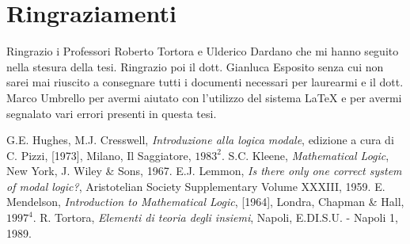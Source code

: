 \documentclass[a4paper, titlepage, 12pt]{report}
\begin{document}
\chapter*{Ringraziamenti}
Ringrazio i Professori Roberto Tortora e Ulderico Dardano che mi hanno seguito
nella stesura della tesi. Ringrazio poi il dott. Gianluca Esposito senza cui
non sarei mai riuscito a consegnare tutti i documenti necessari per laurearmi
e il dott. Marco Umbrello per avermi aiutato con l'utilizzo del sistema \LaTeX{}
e per avermi segnalato vari errori presenti in questa tesi.

\begin{thebibliography}{5}
 G.E. Hughes, M.J. Cresswell, \textit{Introduzione alla logica modale},
edizione a cura di C. Pizzi, [1973], Milano, Il Saggiatore, $1983^{2}$.
 S.C. Kleene, \textit{Mathematical Logic}, New York, J. Wiley \& Sons, 1967.
 E.J. Lemmon, \textit{Is there only one correct system of modal logic?}, Aristotelian Society Supplementary Volume XXXIII, 1959.
 E. Mendelson, \textit{Introduction to Mathematical Logic}, [1964], Londra, Chapman \& Hall, $1997^{4}$.
 R. Tortora, \textit{Elementi di teoria degli insiemi}, Napoli, E.DI.S.U. - Napoli 1, 1989.
\end{thebibliography}
\end{document}
